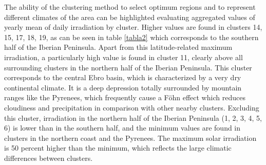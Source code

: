   
The ability of the clustering method to select optimum regions and to represent different climates of the area can be highlighted evaluating aggregated values of yearly mean of daily irradiation by cluster. Higher values are found in clusters 14, 15, 17, 18, 19, as can be seen in table \ref{tabla2} which corresponds to the southern half of the Iberian Peninsula. Apart from this latitude-related maximum irradiation, a particularly high value is found in cluster 11, clearly above all surrounding clusters in the northern half of the Iberian Peninsula. This cluster corresponds to the central Ebro basin, which is characterized by a very dry continental climate. It is a deep depression totally surrounded by mountain ranges like the Pyrenees,  which frequently cause a Föhn effect which reduces cloudiness and precipitation in comparison with other nearby clusters. Excluding this cluster, irradiation in the northern half of the Iberian Peninsula (1, 2, 3, 4, 5, 6) is lower than in the southern half, and the minimum values are found in clusters in the northern coast and the Pyrenees. The maximum solar irradiation is 50 percent higher than the minimum, which reflects the large climatic differences between clusters.

